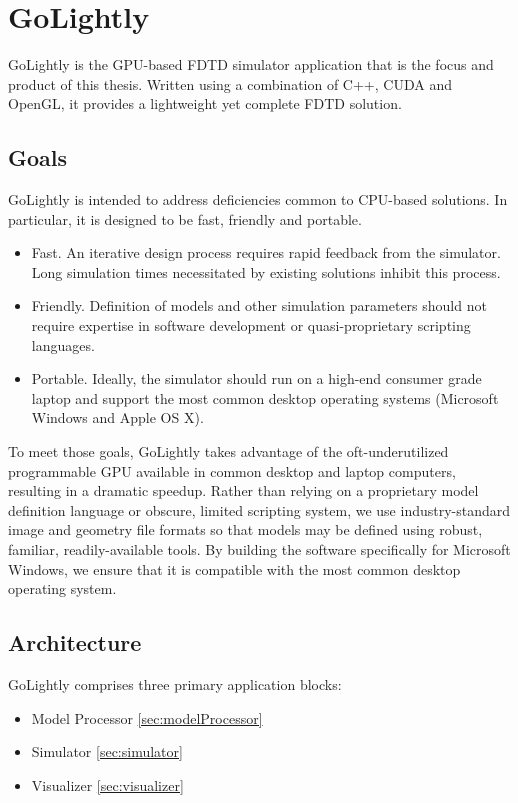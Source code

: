 \chapter{GoLightly} \label{ch:golightly}

GoLightly is the GPU-based FDTD simulator application that is the focus and product of this thesis. Written using a combination of C++, CUDA and OpenGL, it provides a lightweight yet complete FDTD solution.

\section{Goals}

GoLightly is intended to address deficiencies common to CPU-based solutions. In particular, it is designed to be fast, friendly and portable.


\begin{itemize}
	\item Fast. An iterative design process requires rapid feedback from the simulator. Long simulation times necessitated by existing solutions inhibit this process.
	\item Friendly. Definition of models and other simulation parameters should not require expertise in software development or quasi-proprietary scripting languages. 
	\item Portable. Ideally, the simulator should run on a high-end consumer grade laptop and support the most common desktop operating systems (Microsoft Windows and Apple OS X).  
\end{itemize}

To meet those goals, GoLightly takes advantage of the oft-underutilized programmable GPU available in common desktop and laptop computers, resulting in a dramatic speedup. Rather than relying on a proprietary model definition language or obscure, limited scripting system, we use industry-standard image and geometry file formats so that models may be defined using robust, familiar, readily-available tools. By building the software specifically for Microsoft Windows, we ensure that it is compatible with the most common desktop operating system. 

\section{Architecture}

GoLightly comprises three primary application blocks:

\begin{itemize}
	\item Model Processor \ref{sec:modelProcessor}
	\item Simulator \ref{sec:simulator}
	\item Visualizer \ref{sec:visualizer}
\end{itemize}

